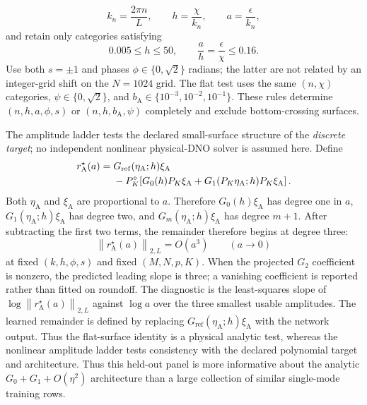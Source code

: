 \documentclass[11pt]{article}
\newcommand{\norm}[1]{\left\lVert #1\right\rVert}
\begin{document}
\begin{equation}
  k_n=\frac{2\pi n}{L},\qquad h=\frac{\chi}{k_n},\qquad
  a=\frac{\epsilon}{k_n},
\end{equation}
and retain only categories satisfying
\begin{equation}
  0.005\leq h\leq50,\qquad
  \frac{a}{h}=\frac{\epsilon}{\chi}\leq0.16.
  \label{eq:airy-feasibility}
\end{equation}
Use both $s=\pm1$ and phases $\phi\in\{0,\sqrt2\}$ radians; the latter are
not related by an integer-grid shift on the $N=1024$ grid.  The flat test
uses the same $(n,\chi)$ categories, $\psi\in\{0,\sqrt2\}$, and
$b_{\mathrm A}\in\{10^{-3},10^{-2},10^{-1}\}$.  These rules determine
$(n,h,a,\phi,s)$ or $(n,h,b_{\mathrm A},\psi)$ completely and exclude
bottom-crossing surfaces.

The amplitude ladder tests the declared small-surface structure of the
\emph{discrete target}; no independent nonlinear physical-DNO solver is
assumed here.  Define
\begin{align}
  r_{\mathrm A}^{\star}(a)
  ={}&G_{\mathrm{ref}}(\eta_{\mathrm A};h)\xi_{\mathrm A}\notag\\
   &-P_K^\circ\!\left[
      G_0(h)P_K\xi_{\mathrm A}
      +G_1(P_K\eta_{\mathrm A};h)P_K\xi_{\mathrm A}
    \right].
  \label{eq:airy-discrete-remainder}
\end{align}
Both $\eta_{\mathrm A}$ and $\xi_{\mathrm A}$ are proportional to $a$.
Therefore $G_0(h)\xi_{\mathrm A}$ has degree one in $a$,
$G_1(\eta_{\mathrm A};h)\xi_{\mathrm A}$ has degree two, and
$G_m(\eta_{\mathrm A};h)\xi_{\mathrm A}$ has degree $m+1$.  After subtracting
the first two terms, the remainder therefore begins at degree three:
\begin{equation}
  \norm{r_{\mathrm A}^{\star}(a)}_{2,L}=O(a^3)
  \qquad(a\to0)
  \label{eq:airy-remainder-scaling}
\end{equation}
at fixed $(k,h,\phi,s)$ and fixed $(M,N,p,K)$.  When the projected $G_2$
coefficient is nonzero, the predicted leading slope is three; a vanishing
coefficient is reported rather than fitted on roundoff.  The diagnostic is
the least-squares slope of $\log\norm{r_{\mathrm A}^{\star}(a)}_{2,L}$
against $\log a$ over the three smallest usable amplitudes.  The learned
remainder is defined by replacing $G_{\mathrm{ref}}(\eta_{\mathrm A};h)
\xi_{\mathrm A}$ with the network output.
Thus the flat-surface identity is a physical analytic test, whereas the
nonlinear amplitude ladder tests consistency with the declared polynomial
target and architecture.
Thus this held-out panel is more informative about the analytic
$G_0+G_1+O(\eta^2)$ architecture than a large collection of similar
single-mode training rows.
\end{document}
